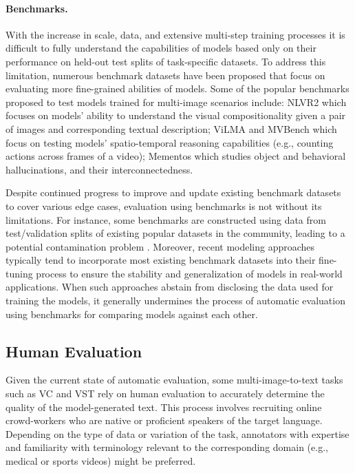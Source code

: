 \paragraph{Benchmarks.}
With the increase in scale, data, and extensive multi-step training processes it is difficult to fully understand the capabilities of models based only on their performance on held-out test splits of task-specific datasets. To address this limitation, numerous benchmark datasets have been proposed that focus on evaluating more fine-grained abilities of models. Some of the popular benchmarks proposed to test models trained for multi-image scenarios include: NLVR2 \cite{cc_nlvr2} which focuses on models' ability to understand the visual compositionality given a pair of images and corresponding textual description; ViLMA \cite{vc_vilma} and MVBench \cite{videoqa_mvbench} which focus on testing models' spatio-temporal reasoning capabilities (e.g., counting actions across frames of a video); Mementos \cite{mementos} which studies object and behavioral hallucinations, and their interconnectedness.

Despite continued progress to improve and update existing benchmark datasets to cover various edge cases, evaluation using benchmarks is not without its limitations. For instance, some benchmarks are constructed using data from test/validation splits of existing popular datasets in the community, leading to a potential contamination problem \cite{contaminated_benchmarks}. Moreover, recent modeling approaches typically tend to incorporate most existing benchmark datasets into their fine-tuning process to ensure the stability and generalization of models in real-world applications. When such approaches abstain from disclosing the data used for training the models, it generally undermines the process of automatic evaluation using benchmarks for comparing models against each other.

\subsection{Human Evaluation}

Given the current state of automatic evaluation, some multi-image-to-text tasks such as \color{xkcdVividBlue}VC \color{black}and \color{xkcdVividBlue}VST \color{black}rely on human evaluation to accurately determine the quality of the model-generated text. This process involves recruiting online crowd-workers who are native or proficient speakers of the target language. Depending on the type of data or variation of the task, annotators with expertise and familiarity with terminology relevant to the corresponding domain (e.g., medical or sports videos) might be preferred.


